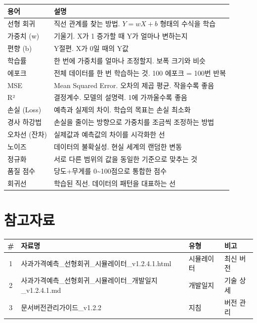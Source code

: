 \documentclass[11pt,a4paper]{article}
\begin{document}
\begin{center}
\begin{longtable}{lp{9cm}}
\toprule
\textbf{용어} & \textbf{설명} \\
\midrule
\endhead

선형 회귀 & 직선 관계를 찾는 방법. $Y = wX + b$ 형태의 수식을 학습 \\
\midrule
가중치 (w) & 기울기. X가 1 증가할 때 Y가 얼마나 변하는지 \\
\midrule
편향 (b) & Y절편. X가 0일 때의 Y값 \\
\midrule
학습률 & 한 번에 가중치를 얼마나 조정할지. 보폭 크기와 비슷 \\
\midrule
에포크 & 전체 데이터를 한 번 학습하는 것. 100 에포크 = 100번 반복 \\
\midrule
MSE & Mean Squared Error. 오차의 제곱 평균. 작을수록 좋음 \\
\midrule
R² & 결정계수. 모델의 설명력. 1에 가까울수록 좋음 \\
\midrule
손실 (Loss) & 예측과 실제의 차이. 학습의 목표는 손실 최소화 \\
\midrule
경사 하강법 & 손실을 줄이는 방향으로 가중치를 조금씩 조정하는 방법 \\
\midrule
오차선 (잔차) & 실제값과 예측값의 차이를 시각화한 선 \\
\midrule
노이즈 & 데이터의 불확실성. 현실 세계의 랜덤한 변동 \\
\midrule
정규화 & 서로 다른 범위의 값을 동일한 기준으로 맞추는 것 \\
\midrule
품질 점수 & 당도+무게를 0\textasciitilde100점으로 통합한 점수 \\
\midrule
회귀선 & 학습된 직선. 데이터의 패턴을 대표하는 선 \\
\bottomrule
\end{longtable}
\end{center}

\section*{참고자료}

\begin{center}
\begin{tabular}{clll}
\toprule
\textbf{\#} & \textbf{자료명} & \textbf{유형} & \textbf{비고} \\
\midrule
1 & 사과가격예측\_선형회귀\_시뮬레이터\_v1.2.4.1.html & 시뮬레이터 & 최신 버전 \\
2 & 사과가격예측\_선형회귀\_시뮬레이터\_개발일지\_v1.2.4.1.md & 개발일지 & 기술 상세 \\
3 & 문서버전관리가이드\_v1.2.2 & 지침 & 버전 관리 \\
\bottomrule
\end{tabular}
\end{center}
\end{document}
